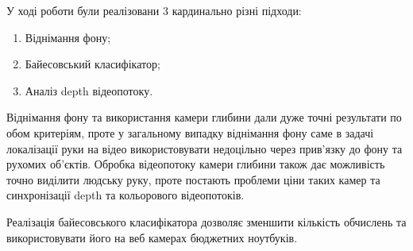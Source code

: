 
У ході роботи були реалізовани 3 кардинально різні підходи:
\begin{enumerate}
	\item Віднімання фону;
	\item Байесовський класифікатор;
	\item Аналіз depth відеопотоку.
\end{enumerate}

Віднімання фону та використання камери глибини дали дуже точні результати по обом критеріям, проте у загальному випадку віднімання фону саме в задачі локалізації руки на відео використовувати недоцільно через прив'язку до фону та рухомих об'єктів. Обробка відеопотоку камери глибини також дає можливість точно виділити людську руку, проте постають проблеми ціни таких камер та синхронізації depth та кольорового відеопотоків.

Реалізація байесовського класифікатора дозволяє зменшити кількість обчислень та використовувати його на веб камерах бюджетних ноутбуків.